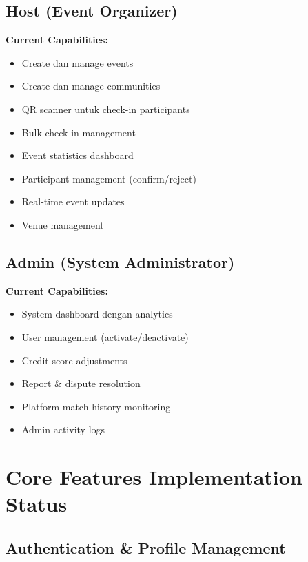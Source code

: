 \documentclass[12pt,a4paper]{article}
\begin{document}
\subsection{Host (Event Organizer)}
\begin{implemented}
\textbf{Current Capabilities:}
\begin{itemize}
    \item Create dan manage events
    \item Create dan manage communities
    \item QR scanner untuk check-in participants
    \item Bulk check-in management
    \item Event statistics dashboard
    \item Participant management (confirm/reject)
    \item Real-time event updates
    \item Venue management
\end{itemize}
\end{implemented}

\subsection{Admin (System Administrator)}
\begin{implemented}
\textbf{Current Capabilities:}
\begin{itemize}
    \item System dashboard dengan analytics
    \item User management (activate/deactivate)
    \item Credit score adjustments
    \item Report \& dispute resolution
    \item Platform match history monitoring
    \item Admin activity logs
\end{itemize}
\end{implemented}

\section{Core Features Implementation Status}

\subsection{Authentication \& Profile Management}
\end{document}
